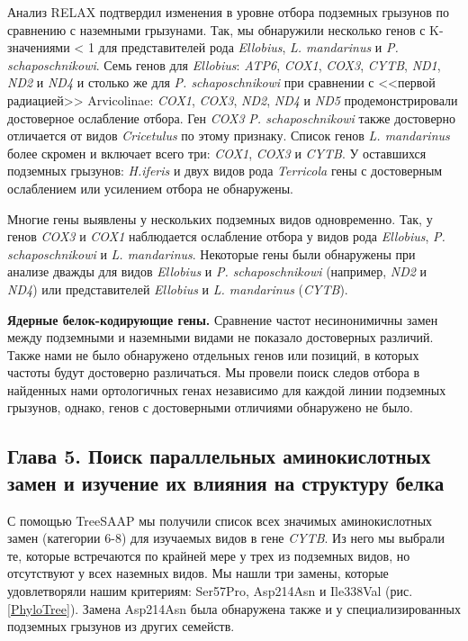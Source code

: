 Анализ RELAX подтвердил изменения в уровне отбора подземных грызунов по сравнению с наземными грызунами. Так, мы обнаружили несколько генов с K-значениями < 1 для представителей рода \textit{Ellobius}, \textit{L. mandarinus} и \textit{P. schaposchnikowi}. Семь генов для \textit{Ellobius}: \textit{ATP6}, \textit{COX1}, \textit{COX3}, \textit{CYTB}, \textit{ND1}, \textit{ND2} и \textit{ND4} и столько же для \textit{P. schaposchnikowi} при сравнении с <<первой радиацией>> Arvicolinae: \textit{COX1}, \textit{COX3}, \textit{ND2}, \textit{ND4} и \textit{ND5} продемонстрировали достоверное ослабление отбора. Ген \textit{COX3} \textit{P. schaposchnikowi} также достоверно отличается от видов \textit{Cricetulus} по этому признаку. Список генов \textit{L. mandarinus} более скромен и включает всего три: \textit{COX1}, \textit{COX3} и \textit{CYTB}. У оставшихся подземных грызунов: \textit{H.iferis} и двух видов рода \textit{Terricola} гены с достоверным ослаблением или усилением отбора не обнаружены.

Многие гены выявлены у нескольких подземных видов одновременно. Так, у генов \textit{COX3} и \textit{COX1} наблюдается ослабление отбора у видов рода \textit{Ellobius}, \textit{P. schaposchnikowi} и \textit{L. mandarinus}. Некоторые гены были обнаружены при анализе дважды для видов \textit{Ellobius} и \textit{P. schaposchnikowi} (например, \textit{ND2} и \textit{ND4}) или представителей \textit{Ellobius} и \textit{L. mandarinus} (\textit{CYTB}).

\textbf{Ядерные белок-кодирующие гены.} Сравнение частот несинонимичны замен между подземными и наземными видами не показало достоверных различий. Также нами не было обнаружено отдельных генов  или позиций, в которых частоты будут достоверно различаться. Мы провели поиск следов отбора в найденных нами ортологичных генах независимо для каждой линии подземных грызунов, однако, генов с достоверными отличиями обнаружено не было. 
 
\subsection*{Глава 5. Поиск параллельных аминокислотных замен и изучение их влияния на структуру белка}

С помощью TreeSAAP мы получили список всех значимых аминокислотных замен (категории 6-8) для изучаемых видов в гене \textit{CYTB}. Из него мы выбрали те, которые встречаются по крайней мере у трех из подземных видов, но отсутствуют у всех наземных видов. Мы нашли три замены, которые удовлетворяли нашим критериям: Ser57Pro, Asp214Asn и Ile338Val (рис. \ref{PhyloTree}). Замена Asp214Asn была обнаружена также и у специализированных подземных грызунов из других семейств.

